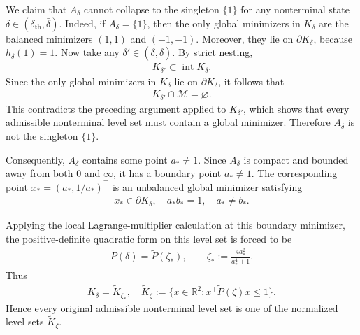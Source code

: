 \documentclass{article}
\begin{document}
We claim that $A_\delta$ cannot collapse to the singleton $\{1\}$ for any
nonterminal state $\delta\in(\delta_{\mathrm{th}},\bar\delta)$. Indeed,
if $A_\delta=\{1\}$, then the only global minimizers in $K_\delta$ are the
balanced minimizers $(1,1)$ and $(-1,-1)$. Moreover, they lie on
$\partial K_\delta$, because $h_\delta(1)=1$. Now take any
$\delta'\in(\delta,\bar\delta)$. By strict nesting,
\begin{align}
K_{\delta'}\subset \operatorname{int}K_\delta .
\end{align}
Since the only global minimizers in $K_\delta$ lie on $\partial K_\delta$, it
follows that
\begin{align}
K_{\delta'}\cap\mathcal M=\varnothing .
\end{align}
This contradicts the preceding argument applied to $K_{\delta'}$, which shows
that every admissible nonterminal level set must contain a global minimizer.
Therefore $A_\delta$ is not the singleton $\{1\}$.

Consequently, $A_\delta$ contains some point $a_\ast\neq 1$. Since
$A_\delta$ is compact and bounded away from both $0$ and $\infty$, it has a
boundary point $a_\ast\neq 1$. The corresponding point
$x_\ast=(a_\ast,1/a_\ast)^\top$ is an unbalanced global minimizer satisfying
\begin{align}
x_\ast\in\partial K_\delta,
\quad
a_\ast b_\ast=1,
\quad
a_\ast\neq b_\ast .
\end{align}

Applying the local Lagrange-multiplier calculation at this boundary minimizer,
the positive-definite quadratic form on this level set is forced to be
\begin{align}
P(\delta)=\widetilde P(\zeta_\ast),
\qquad
\zeta_\ast:=\frac{4a_\ast^2}{a_\ast^4+1}.
\end{align}
Thus
\begin{align}
K_\delta=\widetilde K_{\zeta_\ast},
\quad
\widetilde K_\zeta
:=
\{x\in\mathbb R^2:x^\top \widetilde P(\zeta)x\le 1\}.
\end{align}
Hence every original admissible nonterminal level set is one of the
normalized level sets $\widetilde K_\zeta$.
\end{document}
